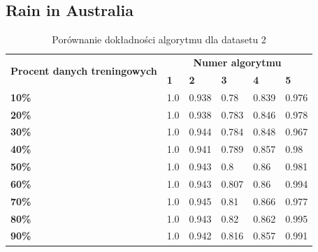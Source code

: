 \documentclass[a4paper,11pt]{article}
\begin{document}
\subsection{Rain in Australia}

\begin{table}[H]
\centering
\begin{tabular}{|l|l|l|l|l|l|}
\hline
\multicolumn{1}{|c|}{\multirow{2}{*}{\textbf{Procent danych treningowych}}} & \multicolumn{5}{c|}{\textbf{Numer algorytmu}}                       \\ \cline{2-6}
\multicolumn{1}{|c|}{}                                                      & \textbf{1} & \textbf{2} & \textbf{3} & \textbf{4} & \textbf{5} \\ \hline
\textbf{10\%}                                                          & 1.0         & 0.938       & 0.78        & 0.839       & 0.976       \\ \hline
\textbf{20\%}                                                          & 1.0         & 0.938       & 0.783       & 0.846       & 0.978       \\ \hline
\textbf{30\%}                                                          & 1.0         & 0.944       & 0.784       & 0.848       & 0.967       \\ \hline
\textbf{40\%}                                                          & 1.0         & 0.941       & 0.789       & 0.857       & 0.98        \\ \hline
\textbf{50\%}                                                          & 1.0         & 0.943       & 0.8         & 0.86        & 0.981       \\ \hline
\textbf{60\%}                                                          & 1.0         & 0.943       & 0.807       & 0.86        & 0.994       \\ \hline
\textbf{70\%}                                                          & 1.0         & 0.945       & 0.81        & 0.866       & 0.977       \\ \hline
\textbf{80\%}                                                          & 1.0         & 0.943       & 0.82        & 0.862       & 0.995       \\ \hline
\textbf{90\%}                                                          & 1.0         & 0.942       & 0.816       & 0.857       & 0.991       \\ \hline
\end{tabular}
\caption{Porównanie dokładności algorytmu dla datasetu 2}
\label{tab:dataset2}
\end{table}
\end{document}
